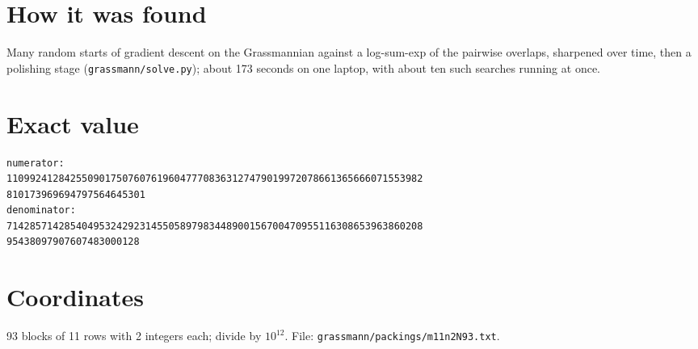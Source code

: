 \documentclass[11pt,a4paper]{article}
\begin{document}
\section{How it was found}
Many random starts of gradient descent on the Grassmannian against a log-sum-exp of the pairwise overlaps, sharpened over time, then a polishing stage (\texttt{grassmann/solve.py}); about 173 seconds on one laptop, with about ten such searches running at once.


\appendix
\section{Exact value}
{\small
\begin{verbatim}
numerator:
110992412842550901750760761960477708363127479019972078661365666071553982
810173969694797564645301
denominator:
714285714285404953242923145505897983448900156700470955116308653963860208
95438097907607483000128
\end{verbatim}}

\section{Coordinates}
93 blocks of 11 rows with 2 integers each; divide by $10^{12}$. File: \texttt{grassmann/packings/m11n2N93.txt}.
{\tiny
\begin{multicols}{4}
\end{multicols}}
\end{document}

